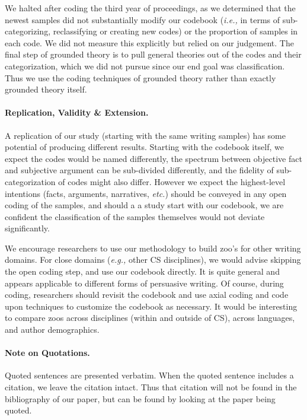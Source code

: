 \documentclass[sigconf]{acmart}
\newcommand{\etc}{\textit{etc.}\xspace}
\newcommand{\ie}{\textit{i.e.,}\xspace}
\newcommand{\eg}{\textit{e.g.,}\xspace}
\begin{document}
We halted after coding the third year of proceedings, as we determined that the newest samples did not substantially modify our codebook (\ie in terms of sub-categorizing, reclassifying or creating new codes) or the proportion of samples in each code. We did not measure this explicitly but relied on our judgement. The final step of grounded theory is to pull general theories out of the codes and their categorization, which we did not pursue since our end goal was classification. Thus we use the coding techniques of grounded theory rather than exactly grounded theory itself. %

\paragraph{Replication, Validity \& Extension.}

A replication of our study (starting with the same writing samples) has some potential of producing different results. Starting with the codebook itself, we expect the codes would be named differently, the spectrum between objective fact and subjective argument can be sub-divided differently, and the fidelity of sub-categorization of codes might also differ. However we expect the highest-level intentions (facts, arguments, narratives, \etc) should be conveyed in any open coding of the samples, and should a a study start with our codebook, we are confident the classification of the samples themselves would not deviate significantly.

We encourage researchers to use our methodology to build zoo's for other writing domains. For close domains (\eg other CS disciplines), we would advise skipping the open coding step, and use our codebook directly. It is quite general and appears applicable to different forms of persuasive writing. Of course, during coding, researchers should revisit the codebook and use axial coding and code upon techniques to customize the codebook as necessary. It would be interesting to compare zoos across disciplines (within and outside of CS), across languages, and author demographics.

\paragraph{Note on Quotations.} Quoted sentences are presented verbatim. When the quoted sentence includes a citation, we leave the citation intact. Thus that citation will not be found in the bibliography of our paper, but can be found by looking at the paper being quoted.
\end{document}
